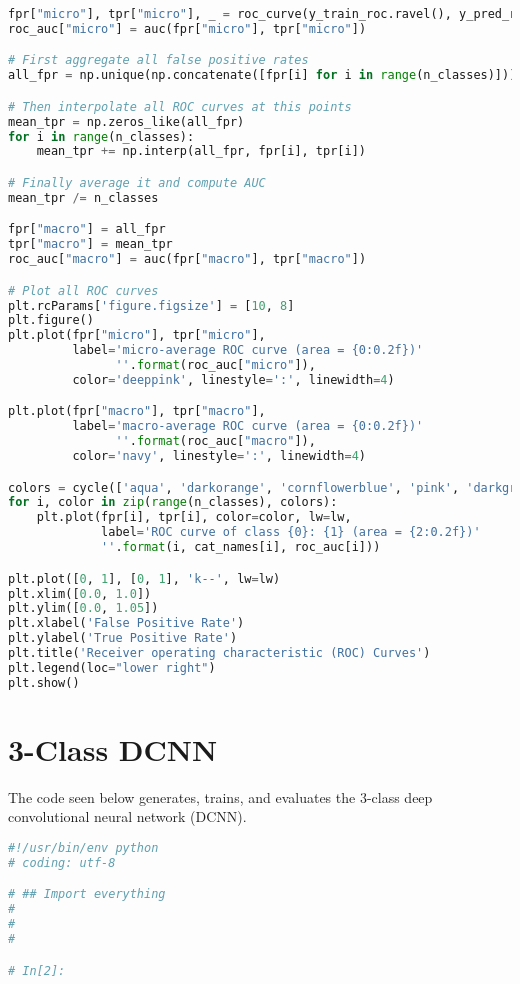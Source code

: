 \documentclass[12pt,letterpaper,oneside,reqno]{book}
\theoremstyle{plain}
\theoremstyle{definition}
\theoremstyle{plain}
\theoremstyle{remark}
\theoremstyle{plain}
\theoremstyle{definition}
\theoremstyle{plain}
\begin{document}
\begin{appendices}
\begin{lstlisting}[language=Python, label=lst:7classfcnnfull, frame=single]
fpr["micro"], tpr["micro"], _ = roc_curve(y_train_roc.ravel(), y_pred_roc.ravel())
roc_auc["micro"] = auc(fpr["micro"], tpr["micro"])

# First aggregate all false positive rates
all_fpr = np.unique(np.concatenate([fpr[i] for i in range(n_classes)]))

# Then interpolate all ROC curves at this points
mean_tpr = np.zeros_like(all_fpr)
for i in range(n_classes):
    mean_tpr += np.interp(all_fpr, fpr[i], tpr[i])

# Finally average it and compute AUC
mean_tpr /= n_classes

fpr["macro"] = all_fpr
tpr["macro"] = mean_tpr
roc_auc["macro"] = auc(fpr["macro"], tpr["macro"])

# Plot all ROC curves
plt.rcParams['figure.figsize'] = [10, 8]
plt.figure()
plt.plot(fpr["micro"], tpr["micro"],
         label='micro-average ROC curve (area = {0:0.2f})'
               ''.format(roc_auc["micro"]),
         color='deeppink', linestyle=':', linewidth=4)

plt.plot(fpr["macro"], tpr["macro"],
         label='macro-average ROC curve (area = {0:0.2f})'
               ''.format(roc_auc["macro"]),
         color='navy', linestyle=':', linewidth=4)

colors = cycle(['aqua', 'darkorange', 'cornflowerblue', 'pink', 'darkgreen', 'maroon', 'olive'])
for i, color in zip(range(n_classes), colors):
    plt.plot(fpr[i], tpr[i], color=color, lw=lw,
             label='ROC curve of class {0}: {1} (area = {2:0.2f})'
             ''.format(i, cat_names[i], roc_auc[i]))

plt.plot([0, 1], [0, 1], 'k--', lw=lw)
plt.xlim([0.0, 1.0])
plt.ylim([0.0, 1.05])
plt.xlabel('False Positive Rate')
plt.ylabel('True Positive Rate')
plt.title('Receiver operating characteristic (ROC) Curves')
plt.legend(loc="lower right")
plt.show()


\end{lstlisting}
\section{3-Class DCNN}
The code seen below generates, trains, and evaluates the 3-class deep convolutional neural network (DCNN).
\begin{lstlisting}[language=Python, label=lst:3classdcnnfull, frame=single]
#!/usr/bin/env python
# coding: utf-8

# ## Import everything
# 
# 
# 

# In[2]:



\end{lstlisting}
\end{appendices}
\end{document}
